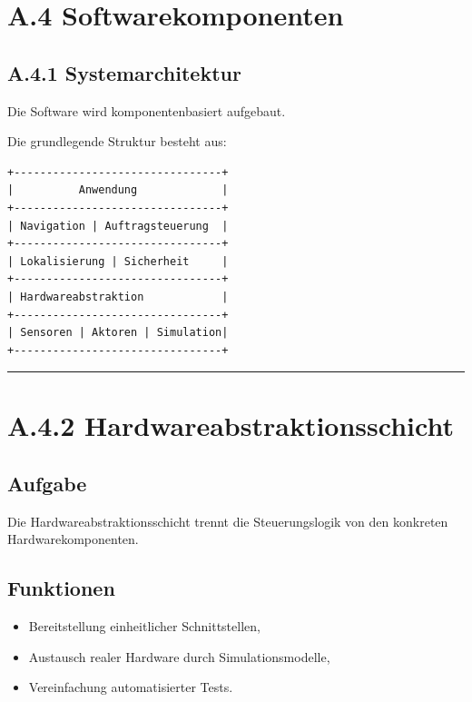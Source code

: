 \documentclass[
]{article}
\providecommand{\tightlist}{%
  \setlength{\itemsep}{0pt}\setlength{\parskip}{0pt}}
\begin{document}
\section{A.4 Softwarekomponenten}\label{a.4-softwarekomponenten}

\subsection{A.4.1 Systemarchitektur}\label{a.4.1-systemarchitektur}

Die Software wird komponentenbasiert aufgebaut.

Die grundlegende Struktur besteht aus:

\begin{verbatim}
+--------------------------------+
|          Anwendung             |
+--------------------------------+
| Navigation | Auftragsteuerung  |
+--------------------------------+
| Lokalisierung | Sicherheit     |
+--------------------------------+
| Hardwareabstraktion            |
+--------------------------------+
| Sensoren | Aktoren | Simulation|
+--------------------------------+
\end{verbatim}

\begin{center}\rule{0.5\linewidth}{0.5pt}\end{center}

\section{A.4.2
Hardwareabstraktionsschicht}\label{a.4.2-hardwareabstraktionsschicht}

\subsection{Aufgabe}\label{aufgabe-6}

Die Hardwareabstraktionsschicht trennt die Steuerungslogik von den
konkreten Hardwarekomponenten.

\subsection{Funktionen}\label{funktionen}

\begin{itemize}
\tightlist
\item
  Bereitstellung einheitlicher Schnittstellen,
\item
  Austausch realer Hardware durch Simulationsmodelle,
\item
  Vereinfachung automatisierter Tests.
\end{itemize}
\end{document}
